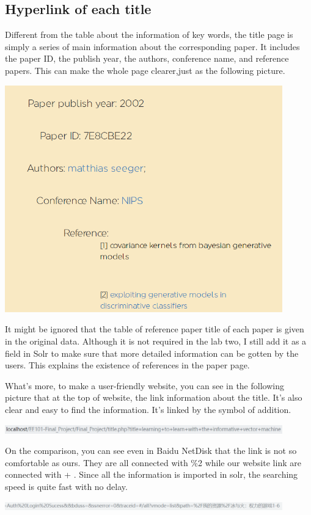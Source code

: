 \documentclass[10pt,twoside,a4paper,titlepage]{article}
\begin{document}
\subsection{Hyperlink of each title}
Different from the table about the information of key words, the title page is simply a series of main information about the corresponding paper. It includes the paper ID, the publish year, the authors, conference name, and reference papers. This can make the whole page clearer,just as the following picture.\newline\par
\includegraphics[width=0.9\textwidth]{jaf/titleexample.PNG}\newline\par
 It might be ignored that the table of reference paper title of each paper is given in the original data. Although it is not required in the lab two, I still add it as a field in Solr to make sure that more detailed information can be gotten by the users. This explains the existence of references in the paper page.\newline\par
What’s more, to make a user-friendly website, you can see in the following picture that at the top of website, the link information about the title. It’s also clear and easy to find the information. It’s linked by the symbol of addition.\par
\includegraphics[width=0.9\textwidth]{jaf/link.PNG}\newline\par
 On the comparison, you can see even in Baidu NetDisk that the link is not so comfortable as ours. They are all connected with \%2 while our website link are connected with + . Since all the information is imported in solr, the searching speed is quite fast with no delay.\par
\includegraphics[width=0.9\textwidth]{jaf/linked.PNG}\newline\par
\end{document}
